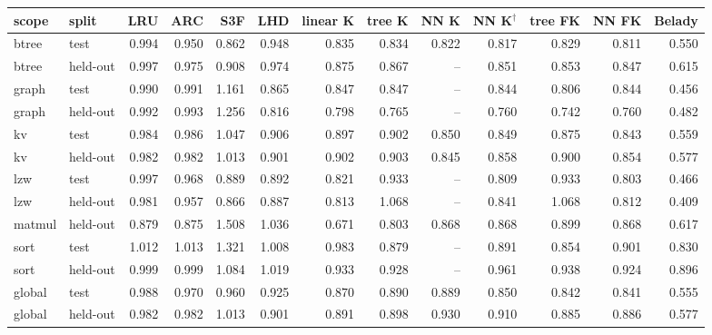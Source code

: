 \begin{tabular}{llrrrrrrrrrrr}
\toprule
scope & split & LRU & ARC & S3F & LHD & linear K & tree K & NN K & NN K$^{\dagger}$ & tree FK & NN FK & Belady \\
\midrule
btree & test & 0.994 & 0.950 & 0.862 & 0.948 & 0.835 & 0.834 & 0.822 & 0.817 & 0.829 & 0.811 & 0.550 \\
btree & held-out & 0.997 & 0.975 & 0.908 & 0.974 & 0.875 & 0.867 & -- & 0.851 & 0.853 & 0.847 & 0.615 \\
graph & test & 0.990 & 0.991 & 1.161 & 0.865 & 0.847 & 0.847 & -- & 0.844 & 0.806 & 0.844 & 0.456 \\
graph & held-out & 0.992 & 0.993 & 1.256 & 0.816 & 0.798 & 0.765 & -- & 0.760 & 0.742 & 0.760 & 0.482 \\
kv & test & 0.984 & 0.986 & 1.047 & 0.906 & 0.897 & 0.902 & 0.850 & 0.849 & 0.875 & 0.843 & 0.559 \\
kv & held-out & 0.982 & 0.982 & 1.013 & 0.901 & 0.902 & 0.903 & 0.845 & 0.858 & 0.900 & 0.854 & 0.577 \\
lzw & test & 0.997 & 0.968 & 0.889 & 0.892 & 0.821 & 0.933 & -- & 0.809 & 0.933 & 0.803 & 0.466 \\
lzw & held-out & 0.981 & 0.957 & 0.866 & 0.887 & 0.813 & 1.068 & -- & 0.841 & 1.068 & 0.812 & 0.409 \\
matmul & held-out & 0.879 & 0.875 & 1.508 & 1.036 & 0.671 & 0.803 & 0.868 & 0.868 & 0.899 & 0.868 & 0.617 \\
sort & test & 1.012 & 1.013 & 1.321 & 1.008 & 0.983 & 0.879 & -- & 0.891 & 0.854 & 0.901 & 0.830 \\
sort & held-out & 0.999 & 0.999 & 1.084 & 1.019 & 0.933 & 0.928 & -- & 0.961 & 0.938 & 0.924 & 0.896 \\
global & test & 0.988 & 0.970 & 0.960 & 0.925 & 0.870 & 0.890 & 0.889 & 0.850 & 0.842 & 0.841 & 0.555 \\
global & held-out & 0.982 & 0.982 & 1.013 & 0.901 & 0.891 & 0.898 & 0.930 & 0.910 & 0.885 & 0.886 & 0.577 \\
\bottomrule
\end{tabular}
